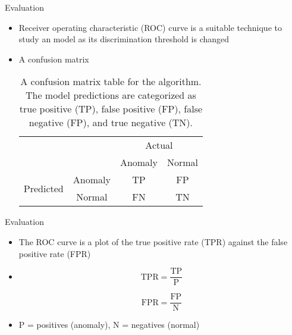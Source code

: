 \begin{frame}{Evaluation}
    \begin{itemize}
        \item Receiver operating characteristic (ROC) curve is a suitable technique to study an \mlblink model as its discrimination threshold is changed
        \item A confusion matrix
            \begin{table}[H]
                \begin{tabular}{cc|cc}
                    \multicolumn{2}{c}{}
                    & \multicolumn{2}{c}{Actual} \\
                    &       &   Anomaly &   Normal \\ 
                    \cline{2-4}
                    \multirow{2}{*}{Predicted}
                        & Anomaly         & TP   & FP  \\
                        & Normal    & FN   & TN  \\ 
                        \cline{2-4}
                \end{tabular}
                \caption{A confusion matrix table for the \mlblink algorithm. The model predictions are categorized as true positive (TP), false positive (FP), false negative (FP), and true negative (TN).}
                \label{table:confusion-matrix}
            \end{table}
    \end{itemize}
\end{frame}

\begin{frame}{Evaluation}
    \begin{itemize}
        \item The ROC curve is a plot of the true positive rate (TPR) against the false positive rate (FPR)
        \item[\xspace]
            \begin{equation} \label{eq:tpr}
                \text{TPR} = \dfrac{\text{TP}}{\text{P}}
            \end{equation}
            
            \begin{equation} \label{eq:fpr}
                \text{FPR} = \dfrac{\text{FP}}{\text{N}}
            \end{equation}  
        \item P = positives (anomaly), N = negatives (normal)
    \end{itemize}
\end{frame}

